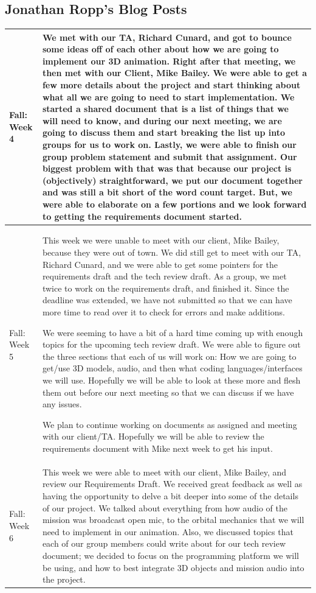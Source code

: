 \documentclass[onecolumn, draftclsnofoot,10pt, compsoc]{IEEEtran}
\begin{document}
\subsection* {Jonathan Ropp's Blog Posts}
\begin{longtable} {|p{1.5cm}|p{13.5cm}|} \hline
Fall: Week 4 & 
We met with our TA, Richard Cunard, and got to bounce some ideas off of each other about how we are going to implement our 3D animation. Right after that meeting, we then met with our Client, Mike Bailey. We were able to get a few more details about the project and start thinking about what all we are going to need to start implementation. We started a shared document that is a list of things that we will need to know, and during our next meeting, we are going to discuss them and start breaking the list up into groups for us to work on. Lastly, we were able to finish our group problem statement and submit that assignment. Our biggest problem with that was that because our project is (objectively) straightforward, we put our document together and was still a bit short of the word count target. But, we were able to elaborate on a few portions and we look forward to getting the requirements document started. \\ \hline

Fall: Week 5 & 
This week we were unable to meet with our client, Mike Bailey, because they were out of town. We did still get to meet with our TA, Richard Cunard, and we were able to get some pointers for the requirements draft and the tech review draft. As a group, we met twice to work on the requirements draft, and finished it. Since the deadline was extended, we have not submitted so that we can have more time to read over it to check for errors and make additions.

We were seeming to have a bit of a hard time coming up with enough topics for the upcoming tech review draft. We were able to figure out the three sections that each of us will work on: How we are going to get/use 3D models, audio, and then what coding languages/interfaces we will use. Hopefully we will be able to look at these more and flesh them out before our next meeting so that we can discuss if we have any issues.

We plan to continue working on documents as assigned and meeting with our client/TA. Hopefully we will be able to review the requirements document with Mike next week to get his input. \\ \hline

Fall: Week 6 & 
This week we were able to meet with our client, Mike Bailey, and review our Requirements Draft. We received great feedback as well as having the opportunity to delve a bit deeper into some of the details of our project. We talked about everything from how audio of the mission was broadcast open mic, to the orbital mechanics that we will need to implement in our animation. Also, we discussed topics that each of our group members could write about for our tech review document; we decided to focus on the programming platform we will be using, and how to best integrate 3D objects and mission audio into the project.


\end{longtable}
\end{document}
